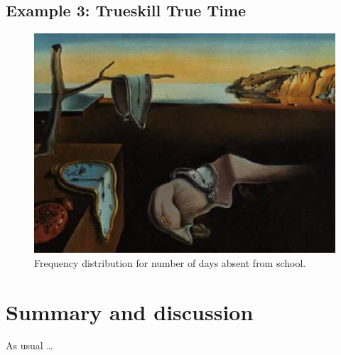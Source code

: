 \documentclass[article]{jss}
\begin{document}
\subsection{Example 3: Trueskill True Time}

\begin{figure}[t!]
\centering
\includegraphics{jsslogo}
\caption{\label{fig:quine} Frequency distribution for number of days absent
from school.}
\end{figure}


























\section{Summary and discussion} \label{sec:summary}

\begin{leftbar}
As usual \dots
\end{leftbar}
\end{document}
